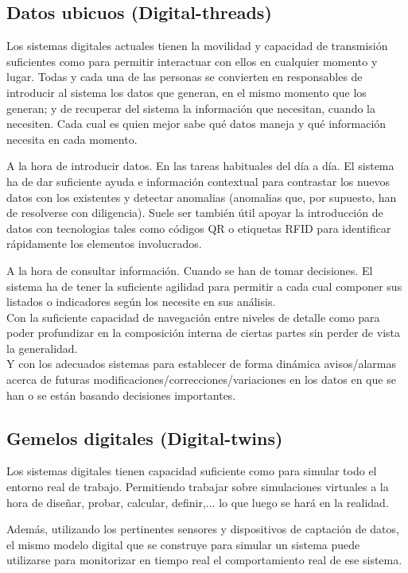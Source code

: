 \documentclass[spanish,12pt,a4paper,final,oneside]{book}
\begin{document}
\subsection{Datos ubicuos (Digital-threads)}
Los sistemas digitales actuales tienen la movilidad y capacidad de transmisión suficientes como para permitir interactuar con ellos en cualquier momento y lugar. Todas y cada una de las personas se convierten en responsables de introducir al sistema los datos que generan, en el mismo momento que los generan; y de recuperar del sistema la información que necesitan, cuando la necesiten. Cada cual es quien mejor sabe qué datos maneja y qué información necesita en cada momento.

A la hora de introducir datos. En las tareas habituales del día a día. El sistema ha de dar suficiente ayuda e información contextual para contrastar los nuevos datos con los existentes y detectar anomalias (anomalias que, por supuesto, han de resolverse con diligencia). Suele ser también útil apoyar la introducción de datos con tecnologias tales como códigos QR o etiquetas RFID para identificar rápidamente los elementos involucrados.

A la hora de consultar información. Cuando se han de tomar decisiones. El sistema ha de tener la suficiente agilidad para permitir a cada cual componer sus listados o indicadores según los necesite en sus análisis. 
\\Con la suficiente capacidad de navegación entre niveles de detalle como para poder profundizar en la composición interna de ciertas partes sin perder de vista la generalidad. 
\\Y con los adecuados sistemas para establecer de forma dinámica avisos/alarmas acerca de futuras modificaciones/correcciones/variaciones en los datos en que se han o se están basando decisiones importantes.

\subsection{Gemelos digitales (Digital-twins)}
Los sistemas digitales tienen capacidad suficiente como para simular todo el entorno real de trabajo. Permitiendo trabajar sobre simulaciones virtuales a la hora de diseñar, probar, calcular, definir,... lo que luego se hará en la realidad.

Además, utilizando los pertinentes sensores y dispositivos de captación de datos, el mismo modelo digital que se construye para simular un sistema puede utilizarse para monitorizar en tiempo real el comportamiento real de ese sistema. 
\end{document}
